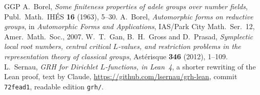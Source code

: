 \documentclass[reqno]{amsart}
\theoremstyle{definition}
\theoremstyle{plain}
\theoremstyle{remark}
\begin{document}
\begin{thebibliography}{GGP}
 A.~Borel, \emph{Some finiteness properties of adele groups over number fields}, Publ.\ Math.\ IH\'ES \textbf{16} (1963), 5--30.
 A.~Borel, \emph{Automorphic forms on reductive groups}, in \emph{Automorphic Forms and Applications}, IAS/Park City Math.\ Ser.\ 12, Amer.\ Math.\ Soc., 2007.
 W.~T.~Gan, B.~H.~Gross and D.~Prasad, \emph{Symplectic local root numbers, central critical \(L\)-values, and restriction problems in the representation theory of classical groups}, Ast\'erisque \textbf{346} (2012), 1--109.
 L.~Sernau, \emph{GRH for Dirichlet \(L\)-functions, in Lean~4}, a shorter rewriting of the Lean proof, text by Claude, \url{https://github.com/lsernau/grh-lean}, commit \texttt{72fead1}, readable edition \texttt{grh/}.
\end{thebibliography}
\end{document}
